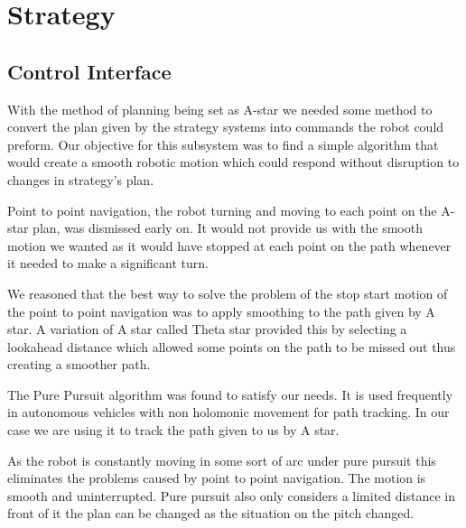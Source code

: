 \section{Strategy}

\subsection{Control Interface}

With the method of planning being set as A-star we needed some method to
convert the plan given by the strategy systems into commands the robot could
preform. Our objective for this subsystem was to find a simple algorithm that
would create a smooth robotic motion which could respond without disruption to
changes in strategy's plan.

Point to point navigation, the robot turning and moving to each point on the
A-star plan, was dismissed early on. It would not provide us with the smooth
motion we wanted as it would have stopped at each point on the path whenever it
needed to make a significant turn.

We reasoned that the best way to solve the problem of the stop start motion of
the point to point navigation was to apply smoothing to the path given by
A star. A variation of A star called Theta star provided this by selecting
a lookahead distance which allowed some points on the path to be missed out
thus creating a smoother path.

The Pure Pursuit algorithm was found to satisfy our needs. It is used
frequently in autonomous vehicles with non holomonic
movement for path tracking\cite{agvpp}\cite{coulterpp}. In our case we are
using it to track the path given to us by A star.

As the robot is constantly moving in some sort of arc under pure pursuit this
eliminates the problems caused by point to point navigation. The motion is
smooth and uninterrupted. Pure pursuit also only considers a limited distance
in front of it the plan can be changed as the situation on the pitch changed.


